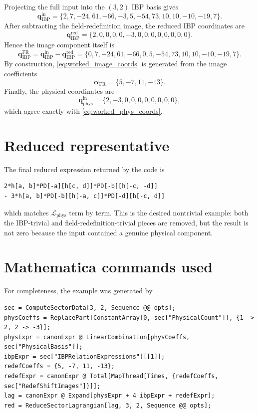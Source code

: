 \documentclass[11pt]{report}
\numberwithin{equation}{chapter}
\newcommand{\Lag}{\mathcal{L}}
\newcommand{\IBP}{\mathrm{IBP}}
\newcommand{\Phys}{\mathrm{phys}}
\newcommand{\FieldRed}{\mathrm{FR}}
\begin{document}
Projecting the full input into the \((3,2)\) IBP basis gives
\begin{equation}
  \bm{q}_{\IBP}^{\mathrm{in}}
  =
  \{2,7,-24,61,-66,-3,5,-54,73,10,10,-10,-19,7\}.
  \label{eq:worked_input_ibp_coords}
\end{equation}
After subtracting the field-redefinition image, the reduced IBP coordinates are
\begin{equation}
  \bm{q}_{\IBP}^{\mathrm{red}}
  =
  \{2,0,0,0,0,-3,0,0,0,0,0,0,0,0\}.
  \label{eq:worked_reduced_ibp_coords}
\end{equation}
Hence the image component itself is
\begin{equation}
  \bm{q}_{\IBP}^{\FieldRed}
  =
  \bm{q}_{\IBP}^{\mathrm{in}} - \bm{q}_{\IBP}^{\mathrm{red}}
  =
  \{0,7,-24,61,-66,0,5,-54,73,10,10,-10,-19,7\}.
  \label{eq:worked_image_coords}
\end{equation}
By construction, \eqref{eq:worked_image_coords} is generated from the image coefficients
\begin{equation}
  \bm{\alpha}_{\FieldRed}
  =
  \{5,-7,11,-13\}.
  \label{eq:worked_recovered_alpha}
\end{equation}
Finally, the physical coordinates are
\begin{equation}
  \bm{q}_{\Phys}^{\mathrm{in}}
  =
  \{2,-3,0,0,0,0,0,0,0,0\},
  \label{eq:worked_final_phys_coords}
\end{equation}
which agree exactly with \eqref{eq:worked_phys_coords}.

\section{Reduced representative}

The final reduced expression returned by the code is
\begin{lstlisting}[style=mma]
2*h[a, b]*PD[-a][h[c, d]]*PD[-b][h[-c, -d]]
- 3*h[a, b]*PD[-b][h[-a, c]]*PD[-d][h[-c, d]]
\end{lstlisting}
which matches \(\Lag_{\Phys}\) term by term.
This is the desired nontrivial example:
both the IBP-trivial and field-redefinition-trivial pieces are removed,
but the result is not zero because the input contained a genuine physical component.

\section{Mathematica commands used}

For completeness, the example was generated by
\begin{lstlisting}[style=mma]
sec = ComputeSectorData[3, 2, Sequence @@ opts];
physCoeffs = ReplacePart[ConstantArray[0, sec["PhysicalCount"]], {1 -> 2, 2 -> -3}];
physExpr = canonExpr @ LinearCombination[physCoeffs, sec["PhysicalBasis"]];
ibpExpr = sec["IBPRelationExpressions"][[1]];
redefCoeffs = {5, -7, 11, -13};
redefExpr = canonExpr @ Total[MapThread[Times, {redefCoeffs, sec["RedefShiftImages"]}]];
lag = canonExpr @ Expand[physExpr + 4 ibpExpr + redefExpr];
red = ReduceSectorLagrangian[lag, 3, 2, Sequence @@ opts];
\end{lstlisting}
\end{document}
